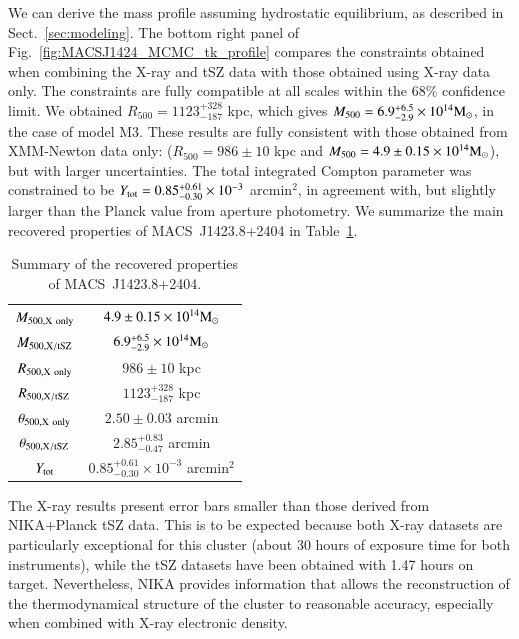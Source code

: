 \documentclass[traditabstract]{aa}
\begin{document}
We can derive the mass profile assuming hydrostatic equilibrium, as described in Sect.~\ref{sec:modeling}. The bottom right panel of Fig.~\ref{fig:MACSJ1424_MCMC_tk_profile} compares the constraints obtained when combining the X-ray and tSZ data with those obtained using X-ray data only. The constraints are fully compatible at all scales within the 68\% confidence limit. We obtained $R_{500} = 1123^{+328}_{-187}$ kpc, which gives $M_{500} = 6.9^{+6.5}_{-2.9}  \times 10^{14} {\rm M}_{\odot}$, in the case of model M3. These results are fully consistent with those obtained from XMM-Newton data only: ($R_{500} = 986 \pm 10$ kpc and $M_{500} = 4.9 \pm 0.15 \times 10^{14} {\rm M}_{\odot}$), but with larger uncertainties. The total integrated Compton parameter was constrained to be $Y_{\rm tot} = 0.85^{+0.61}_{-0.30} \times 10^{-3}$ arcmin$^2$, in agreement with, but slightly larger than the Planck value from aperture photometry. We summarize the main recovered properties of \mbox{MACS~J1423.8+2404} in Table~\ref{tab:summary}.
\begin{table}[h]
\caption{Summary of the recovered properties of \mbox{MACS~J1423.8+2404}.}
\begin{center}
\begin{tabular}{cc}
\hline
\hline
$M_{500, {\rm X \ only}}$ & $4.9 \pm 0.15 \times 10^{14} {\rm M}_{\odot}$ \\
$M_{500, {\rm X/tSZ}}$ & $6.9^{+6.5}_{-2.9}  \times 10^{14} {\rm M}_{\odot}$\\
$R_{500, {\rm X \ only}}$ & $986 \pm 10$ kpc\\
$R_{500, {\rm X/tSZ}}$ & $1123^{+328}_{-187}$ kpc\\
$\theta_{500, {\rm X \ only}}$ & $2.50 \pm 0.03$ arcmin \\
$\theta_{500, {\rm X/tSZ}}$ & $2.85^{+0.83}_{-0.47}$ arcmin\\
$Y_{\rm tot}$ & $0.85^{+0.61}_{-0.30} \times 10^{-3}$ arcmin$^2$ \\
\hline
\end{tabular}
\end{center}
\label{tab:summary}
\end{table}

The X-ray results present error bars smaller than those derived from NIKA+Planck tSZ data. This is to be expected because both X-ray datasets are particularly exceptional for this cluster (about 30 hours of exposure time for both instruments), while the tSZ datasets have been obtained with 1.47 hours on target. Nevertheless, NIKA provides information that allows the reconstruction of the thermodynamical structure of the cluster to reasonable accuracy, especially when combined with X-ray electronic density.
\end{document}
